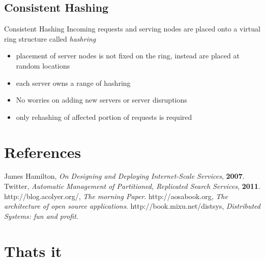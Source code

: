 \documentclass[9pt]{beamer}
\begin{document}

\subsection{Consistent Hashing}
\begin{frame}{Consistent Hashing}
  Incoming requests and serving nodes are placed onto a virtual ring structure called \textit{hashring}

    
  \begin{itemize}
    \item placement of server nodes is not fixed on the ring, instead are placed at random locations
    \item each server owns a range of hashring
    \item No worries on adding new servers or server disruptions
    \item only rehashing of affected portion of requests is required
  \end{itemize}
\end{frame}

\section{References}
\begin{frame}
  
  \begin{thebibliography}{99}
   James Hamilton,  \newblock \emph{On Designing and Deploying Internet-Scale Services}, \textbf{2007}.
   Twitter,  \newblock \emph{Automatic Management of Partitioned, Replicated Search Services}, \textbf{2011}.
   http://blog.acolyer.org/, \newblock \emph{The morning Paper}.
   http://aosabook.org, \newblock \emph{The architecture of open source applications}.
   http://book.mixu.net/distsys, \newblock \emph{Distributed Systems: fun and profit}.
  \end{thebibliography}
\end{frame}

\section{Thats it}
\begin{frame}{}
\end{frame}
\end{document}

